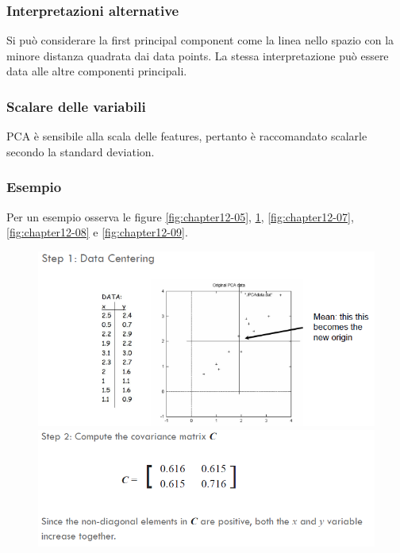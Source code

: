 		\subsubsection{Interpretazioni alternative}
		Si pu\`o considerare la first principal component come la linea nello spazio con la minore distanza quadrata dai data points.
		La stessa interpretazione pu\`o essere data alle altre componenti principali.
		
		\subsubsection{Scalare delle variabili}
		PCA \`e sensibile alla scala delle features, pertanto \`e raccomandato scalarle secondo la standard deviation.
		
		\subsubsection{Esempio}
		
		Per un esempio osserva le figure \ref{fig:chapter12-05}, \ref{fig:chapter12-06}, \ref{fig:chapter12-07}, \ref{fig:chapter12-08} e \ref{fig:chapter12-09}.
		
		
		\begin{figure}
			\centering
			\begin{minipage}{.5\textwidth}
				\centering
				\includegraphics[width=1\linewidth]{imgs/chapter12/img5}
				\caption{}
				\label{fig:chapter12-05}
			\end{minipage}%
			\begin{minipage}{.5\textwidth}
				\centering
				\includegraphics[width=1\linewidth]{imgs/chapter12/img6}
				\caption{}
				\label{fig:chapter12-06}
			\end{minipage}
		\end{figure}
		
